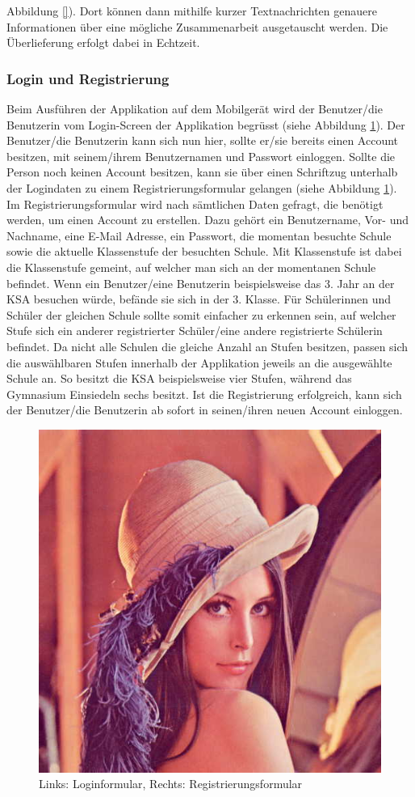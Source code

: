 \documentclass[../main.tex]{subfiles}
\begin{document}
Abbildung \ref{}). Dort können dann mithilfe kurzer Textnachrichten genauere Informationen über eine mögliche Zusammenarbeit ausgetauscht werden. Die Überlieferung erfolgt dabei in Echtzeit.


\subsubsection*{Login und Registrierung}
Beim Ausführen der Applikation auf dem Mobilgerät wird der Benutzer/die Benutzerin vom Login-Screen der Applikation begrüsst (siehe Abbildung \ref{login_register}). Der Benutzer/die Benutzerin kann sich nun hier, sollte er/sie bereits einen Account besitzen, mit seinem/ihrem Benutzernamen und Passwort einloggen. Sollte die Person noch keinen Account besitzen, kann sie über einen Schriftzug unterhalb der Logindaten zu einem Registrierungsformular gelangen (siehe Abbildung \ref{login_register}). Im Registrierungsformular wird nach sämtlichen Daten gefragt, die benötigt werden, um einen Account zu erstellen. Dazu gehört ein Benutzername, Vor- und Nachname, eine E-Mail Adresse, ein Passwort, die momentan besuchte Schule sowie die aktuelle Klassenstufe der besuchten Schule. Mit Klassenstufe ist dabei die Klassenstufe gemeint, auf welcher man sich an der momentanen Schule befindet. Wenn ein Benutzer/eine Benutzerin beispielsweise das 3. Jahr an der KSA besuchen würde, befände sie sich in der 3. Klasse. Für Schülerinnen und Schüler der gleichen Schule sollte somit einfacher zu erkennen sein, auf welcher Stufe sich ein anderer registrierter Schüler/eine andere registrierte Schülerin befindet. Da nicht alle Schulen die gleiche Anzahl an Stufen besitzen, passen sich die auswählbaren Stufen innerhalb der Applikation jeweils an die ausgewählte Schule an. So besitzt die KSA beispielsweise vier Stufen, während das Gymnasium Einsiedeln sechs besitzt. Ist die Registrierung erfolgreich, kann sich der Benutzer/die Benutzerin ab sofort in seinen/ihren neuen Account einloggen.

\begin{figure} 
	\centering
	\includegraphics[width=0.45\textwidth*2, height=0.45\textwidth/9*16]{./images/lena.jpg}
	\caption{Links: Loginformular, Rechts: Registrierungsformular}
	\label{login_register}
\end{figure}
\end{document}
